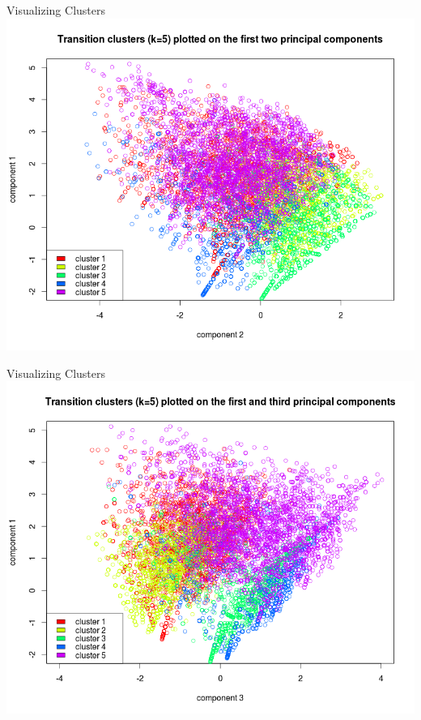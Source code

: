 \documentclass[12pt]{beamer}
\begin{document}
\begin{frame}{Visualizing Clusters}
\includegraphics[height=\textheight]{plots/trans_pca1}
\end{frame}
\begin{frame}{Visualizing Clusters}
\includegraphics[height=\textheight]{plots/trans_pca2}
\end{frame}
\end{document}
